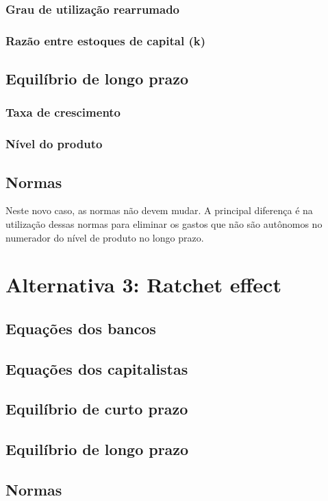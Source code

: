 \documentclass[11pt]{article}
\begin{document}
\subsubsection*{Grau de utilização rearrumado}
\label{sec:orga4503c5}


\subsubsection*{Razão entre estoques de capital (k)}
\label{sec:orgf8a18df}



\subsection*{Equilíbrio de longo prazo}
\label{sec:orgd6353e9}

\subsubsection*{Taxa de crescimento}
\label{sec:org85a27a1}

\subsubsection*{Nível do produto}
\label{sec:org78ea85f}

\subsection*{Normas}
\label{sec:org4738523}

Neste novo caso, as normas não devem mudar.
A principal diferença é na utilização dessas normas para eliminar os gastos que não são autônomos no numerador do nível de produto no longo prazo.



\section*{Alternativa 3: Ratchet effect}
\label{sec:org43ae053}

\subsection*{Equações dos bancos}
\label{sec:org0fc496d}

\subsection*{Equações dos capitalistas}
\label{sec:orgd5abf47}

\subsection*{Equilíbrio de curto prazo}
\label{sec:org9217664}

\subsection*{Equilíbrio de longo prazo}
\label{sec:org316c271}

\subsection*{Normas}
\label{sec:orgadad719}
\end{document}
